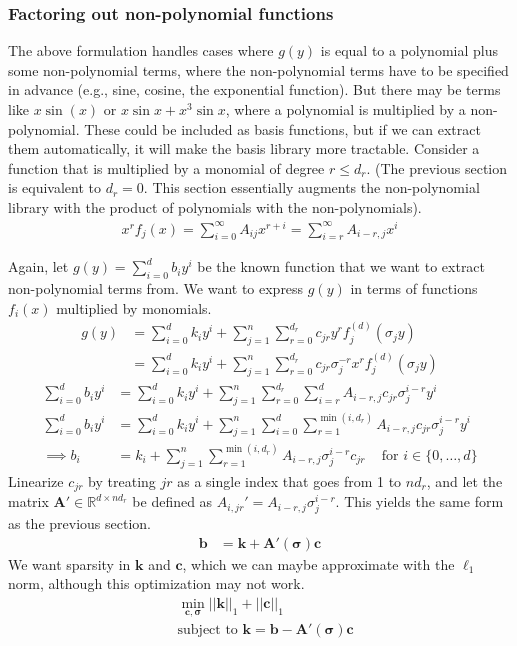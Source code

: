 \documentclass{article}
\let\vec\mathbf
\def\real{\mathbb{R}}
\begin{document}
\subsubsection{Factoring out non-polynomial functions}

The above formulation handles cases where $g(y)$ is equal to a polynomial plus
some non-polynomial terms, where the non-polynomial terms have to be specified
in advance (e.g., sine, cosine, the exponential function). But there may be
terms like $x \sin(x)$ or $x\sin x + x^3\sin x$, where a polynomial is
multiplied by a non-polynomial. These could be included as basis functions, but
if we can extract them automatically, it will make the basis library more
tractable. Consider a function that is multiplied by a monomial of degree $r \le
d_r$. (The previous section is equivalent to $d_r=0$. This section essentially
augments the non-polynomial library with the product of polynomials with the
non-polynomials).
\begin{align*}
x^r f_j(x) = \sum_{i=0}^\infty A_{ij} x^{r+i} = \sum_{i=r}^\infty A_{i-r,j} x^{i}
\end{align*}


Again, let $g(y) = \sum_{i=0}^d b_i y^i$ be the known function that we want
to extract non-polynomial terms from. We want to express $g(y)$ in terms of
functions $f_i(x)$ multiplied by monomials.
\begin{align*}
g(y) &= \sum_{i=0}^d k_i y^i + \sum_{j=1}^n \sum_{r=0}^{d_r} c_{jr} y^r f_j^{(d)}(\sigma_j y)
\\   &= \sum_{i=0}^d k_i y^i + \sum_{j=1}^n \sum_{r=0}^{d_r} c_{jr} \sigma_j^{-r} x^r f_j^{(d)}(\sigma_j y)
\end{align*}
\begin{align*}
\sum_{i=0}^d b_i y^i &= \sum_{i=0}^d k_i y^i + \sum_{j=1}^n \sum_{r=0}^{d_r} \sum_{i=r}^d A_{i-r,j} c_{jr} \sigma_j^{i-r} y^i \\
\sum_{i=0}^d b_i y^i &= \sum_{i=0}^d k_i y^i + \sum_{j=1}^n \sum_{i=0}^d \sum_{r=1}^{\min(i,d_r)} A_{i-r,j} c_{jr} \sigma_j^{i-r} y^i
\\ \implies b_i &= k_i + \sum_{j=1}^n \sum_{r=1}^{\min(i,d_r)}  A_{i-r,j} \sigma_j^{i-r} c_{jr}
\,\,\,\,\, \text{ for $i \in \{0, \hdots, d\}$}
\end{align*}
Linearize $c_{jr}$ by treating $jr$ as a single index that goes from 1 to $nd_r$,
and let the matrix $\vec{A}' \in \real^{d \times nd_r}$ be defined as $A_{i,jr}' =
A_{i-r,j}\sigma_j^{i-r}$. This yields the same form as the previous section.
\begin{align*}
\vec{b} &= \vec{k} + \vec{A}'(\vec{\sigma}) \vec{c}
\end{align*}
We want sparsity in $\vec{k}$ and $\vec{c}$, which we can maybe approximate with
the $\ell_1$ norm, although this optimization may not work.
\begin{align*}
&\min_{\vec{c},\vec{\sigma}} ||\vec{k}||_1 + ||\vec{c}||_1
\\& \text{subject to } \vec{k} =  \vec{b} - \vec{A}'(\vec{\sigma})\vec{c}
\end{align*}
\end{document}

